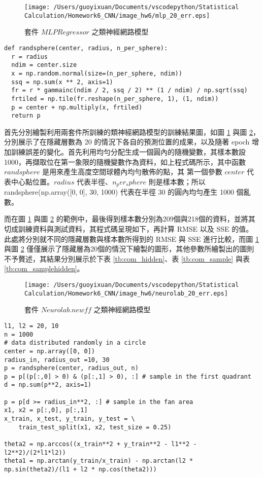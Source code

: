\begin{figure}[H]
    \centering
        \texttt{[image: /Users/guoyixuan/Documents/vscodepython/Statistical Calculation/Homework6\_CNN/image\_hw6/mlp\_20\_err.eps]}
    \caption{套件 $MLPRegressor$ 之類神經網路模型}
    \label{fig:mlp}
\end{figure}

\begin{lstlisting}
def randsphere(center, radius, n_per_sphere):
  r = radius
  ndim = center.size
  x = np.random.normal(size=(n_per_sphere, ndim))
  ssq = np.sum(x ** 2, axis=1)
  fr = r * gammainc(ndim / 2, ssq / 2) ** (1 / ndim) / np.sqrt(ssq)
  frtiled = np.tile(fr.reshape(n_per_sphere, 1), (1, ndim))
  p = center + np.multiply(x, frtiled)
  return p
\end{lstlisting}

首先分別繪製利用兩套件所訓練的類神經網路模型的訓練結果圖，如圖 \ref{fig:mlp} 與圖 \ref{fig:neural}，分別展示了在隱藏層數為 20 的情況下各自的預測位置的成果，以及隨著 epoch 增加訓練誤差的變化。首先利用均勻分配生成一個圓內的隨機變數，其樣本數設1000，再擷取位在第一象限的隨機變數作為資料，如上程式碼所示，其中函數 $randsphere$ 是用來產生高度空間球體內均勻散佈的點，其
第一個參數 $center$ 代表中心點位置。$radius$ 代表半徑、$n_per_sphere$ 則是樣本數；所以 randsphere(np.array([0, 0], 30, 1000) 代表在半徑 30 的圓內均勻產生
1000 個亂數。

而在圖 \ref{fig:mlp} 與圖 \ref{fig:neural} 的範例中，最後得到樣本數分別為209個與218個的資料，並將其切成訓練資料與測試資料，其程式碼呈現如下，再計算 RMSE 以及 SSE 的值。此處將分別就不同的隱藏層數與樣本數所得到的 RMSE 與 SSE 進行比較，而圖 \ref{fig:mlp} 與圖 \ref{fig:neural} 僅僅展示了隱藏層為20個的情況下繪製的圖形，其他參數所繪製出的圖則不予贅述，其結果分別展示於下表 \ref{tb:com_hidden}、表 \ref{tb:com_sample} 與表 \ref{tb:com_samplehidden}。

\begin{figure}[H]
    \centering
        \texttt{[image: /Users/guoyixuan/Documents/vscodepython/Statistical Calculation/Homework6\_CNN/image\_hw6/neurolab\_20\_err.eps]}
    \caption{套件 $Neurolab.newff$ 之類神經網路模型}
    \label{fig:neural}
\end{figure}

\begin{lstlisting}
l1, l2 = 20, 10
n = 1000
# data distributed randomly in a circle
center = np.array([0, 0])
radius_in, radius_out =10, 30
p = randsphere(center, radius_out, n)
p = p[(p[:,0] > 0) & (p[:,1] > 0), :] # sample in the first quadrant
d = np.sum(p**2, axis=1)

p = p[d >= radius_in**2, :] # sample in the fan area
x1, x2 = p[:,0], p[:,1]
x_train, x_test, y_train, y_test = \
    train_test_split(x1, x2, test_size = 0.25)

theta2 = np.arccos((x_train**2 + y_train**2 - l1**2 - l2**2)/(2*l1*l2))
theta1 = np.arctan(y_train/x_train) - np.arctan(l2 * np.sin(theta2)/(l1 + l2 * np.cos(theta2)))
\end{lstlisting}

